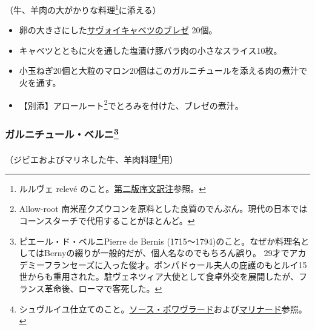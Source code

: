 \begin{recette}


（牛、羊肉の大がかりな料理\footnote{ルルヴェ relevé
  のこと。\protect\hyperlink{releve}{第二版序文訳注}参照。}に添える）

\begin{itemize}
\item
  卵の大きさにした\protect\hyperlink{chou-braise}{サヴォイキャベツのブレゼ}
  20個。
\item
  キャベツとともに火を通した塩漬け豚バラ肉の小さなスライス10枚。
\item
  小玉ねぎ20個と大粒のマロン20個はこのガルニチュールを添える肉の煮汁で火を通す。
\item
  【別添】アロールート\footnote{Allow-root
    南米産クズウコンを原料とした良質のでんぷん。現代の日本ではコーンスターチで代用することがほとんど。}でとろみを付けた、ブレゼの煮汁。
\end{itemize}

\atoaki{}

\hypertarget{garniture-berny}{%
\subsubsection[ガルニチュール・ベルニ]{\texorpdfstring{ガルニチュール・ベルニ\footnote{ピエール・ド・ベルニPierre
  de Bernis
  (1715〜1794)のこと。なぜか料理名としてはBernyの綴りが一般的だが、個人名なのでもちろん誤り。
  29才でアカデミーフランセーズに入った俊才。ポンパドゥール夫人の庇護のもとルイ15世からも重用された。駐ヴェネツィア大使として食卓外交を展開したが、フランス革命後、ローマで客死した。}}{ガルニチュール・ベルニ}}\label{garniture-berny}}



（ジビエおよびマリネした牛、羊肉料理\footnote{シュヴルイユ仕立てのこと。\protect\hyperlink{sauce-poivrade}{ソース・ポワヴラード}および\protect\hyperlink{marinade-crue-pour-viandes-de-boucherie-ou-venaison}{マリナード}参照。}用）


\end{recette}
